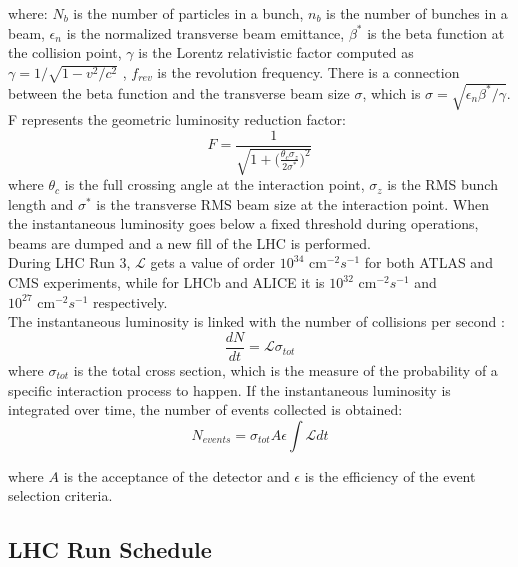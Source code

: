 \noindent where: $N_b$ is the number of particles in a bunch, $n_b$ is the number of bunches in a beam, $\epsilon_n$ is the normalized transverse beam emittance, $\beta^*$ is the beta function at the collision point, $\gamma$ is the Lorentz relativistic factor computed as $\gamma=1/\sqrt{1-v^2/c^2}$ , $f_{rev}$ is the revolution frequency. 
There is a connection between the beta function and the transverse beam size $\sigma$, which is $\sigma=\sqrt{\epsilon_n\beta^*/\gamma}$.
F represents the geometric luminosity reduction factor:
\begin{equation}
    F=\frac{1}{\sqrt{1+\Big(\frac{\theta_c\sigma_z}{2\sigma^*}\Big)^2}}
\end{equation}
\noindent where $\theta_c$ is the full crossing angle at the interaction point, $\sigma_z$ is the RMS bunch length and $\sigma^*$ is the transverse RMS beam size at the interaction point.
When the instantaneous luminosity goes below a fixed threshold during operations, beams are dumped and a new fill of the LHC is performed.\\
During LHC Run 3, $\mathcal{L}$ gets a value of order $10^{34} \text{ cm}^{-2}s^{-1}$ for both ATLAS and CMS experiments, while for LHCb and ALICE it is $10^{32} \text{ cm}^{-2}s^{-1}$ and $10^{27} \text{ cm}^{-2}s^{-1}$ respectively.\\
The instantaneous luminosity is linked with the number of collisions per second :
\begin{equation}\label{eq:dNdt}
    \frac{dN}{dt}=\mathcal{L}\sigma_{tot}
\end{equation}
\noindent where $\sigma_{tot}$ is the total cross section, which is the measure of the probability of a specific interaction process to happen.
If the instantaneous luminosity is integrated over time, the number of events collected is obtained:
\begin{equation}\label{eq:LHCAtlas/LHC/parameters/Nevents}
    N_{events}=\sigma_{tot}A\epsilon \int \mathcal{L} dt 
\end{equation}

\noindent where $A$ is the acceptance of the detector and $\epsilon$ is the efficiency of the event selection criteria.


\subsection{LHC Run Schedule}

